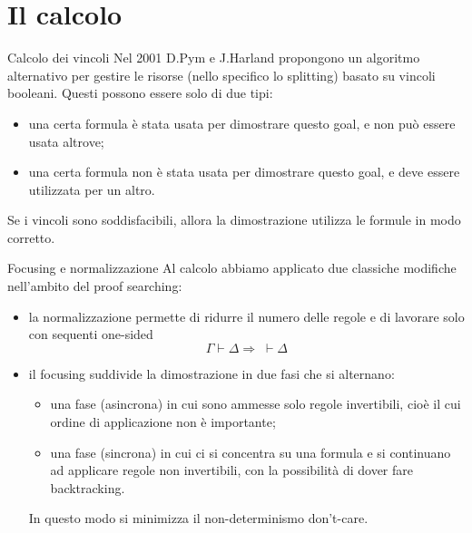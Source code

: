 \documentclass{beamer}
\begin{document}
\section{Il calcolo}
\begin{frame}{Calcolo dei vincoli}
	Nel 2001 D.Pym e J.Harland propongono un algoritmo alternativo per gestire le risorse (nello specifico lo splitting) basato su vincoli booleani.
	Questi possono essere solo di due tipi:
	\begin{itemize}
		\item una certa formula è stata usata per dimostrare questo goal, e non può essere usata altrove;
		\item una certa formula non è stata usata per dimostrare questo goal, e deve essere utilizzata per un altro.
	\end{itemize}
	Se i vincoli sono soddisfacibili, allora la dimostrazione utilizza le formule in modo corretto.
\end{frame}
\begin{frame}{Focusing e normalizzazione}
	Al calcolo abbiamo applicato due classiche modifiche nell'ambito del proof searching:
	\begin{itemize}
		\item<2-> la normalizzazione permette di ridurre il numero delle regole e di lavorare solo con sequenti one-sided
			$$\Gamma \vdash \Delta \Rightarrow \;\vdash \Delta $$
		\item<3-> il focusing suddivide la dimostrazione in due fasi che si alternano:
			\begin{itemize}
				\item una fase (asincrona) in cui sono ammesse solo regole invertibili, cioè il cui ordine di applicazione non è importante;
				\item una fase (sincrona) in cui ci si concentra su una formula e si continuano ad applicare regole non invertibili, con la possibilità di dover fare backtracking.
			\end{itemize}
			In questo modo si minimizza il non-determinismo don't-care.
	\end{itemize}
\end{frame}
\end{document}
